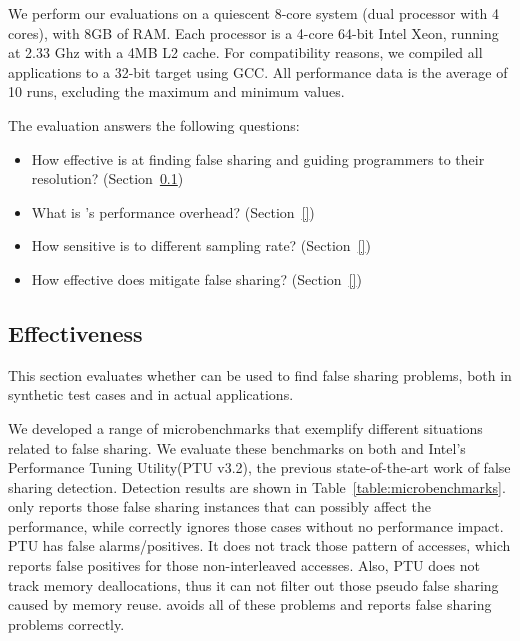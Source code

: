 \label{sec:evaluation}

We perform our evaluations on a quiescent 8-core system (dual
processor with 4 cores), with 8GB of RAM. Each processor is a 4-core 64-bit Intel Xeon, running at 2.33 Ghz with a 4MB L2 cache. For compatibility reasons, we compiled all applications to a 32-bit target using GCC. All performance data is the average of 10 runs, excluding the maximum and minimum values.

The evaluation answers the following questions:

\begin{itemize}
\item How effective is \sheriffdetect{} at finding false sharing and guiding programmers to their resolution? (Section~\ref{sec:effecteval})
\item What is \sheriffdetect{}'s performance overhead? (Section~\ref{})
\item How sensitive is \sheriffdetect{} to different sampling rate? (Section~\ref{}) 
\item How effective does \sheriffprotect{} mitigate false sharing? (Section~\ref{})
\end{itemize}

\subsection{\sheriffdetect{} Effectiveness}

\label{sec:effecteval}

This section evaluates whether \sheriffdetect{} can be used to find false sharing problems, both in synthetic test cases and in actual applications.

We developed a range of microbenchmarks that exemplify different situations related to false sharing. We evaluate these benchmarks on both \SheriffDetect{} and Intel's Performance Tuning Utility(PTU v3.2), the previous state-of-the-art work of false sharing detection.
Detection results are shown in Table~\ref{table:microbenchmarks}. \sheriffdetect{} only reports those false sharing instances that can possibly affect the performance, while correctly ignores those cases without no performance impact.
PTU has false alarms/positives.  It does not track those pattern of accesses, which reports false positives for those non-interleaved accesses. Also, PTU does not track memory deallocations, thus it can not filter out those pseudo false sharing caused by memory reuse. \sheriffdetect{} avoids all of these problems and reports false sharing problems correctly. 


